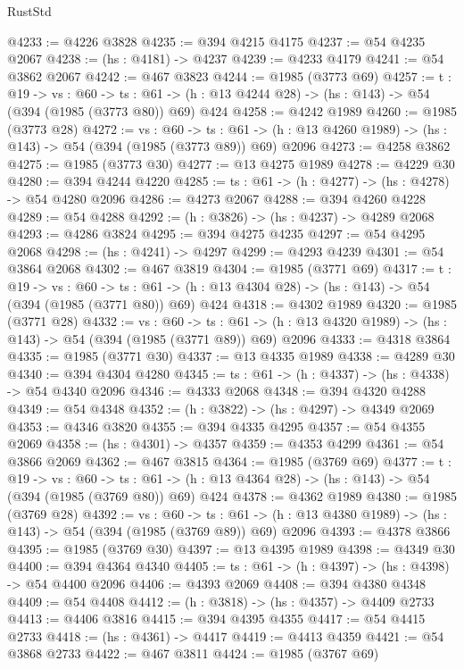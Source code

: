 \begin{lexlean}{RustStd}
\begin{coremodule}
@4233 := @4226 @3828
@4235 := @394 @4215 @4175
@4237 := @54 @4235 @2067
@4238 := (hs : @4181) -> @4237
@4239 := @4233 @4179
@4241 := @54 @3862 @2067
@4242 := @467 @3823
@4244 := @1985 (@3773 @69)
@4257 := {t : @19} ->
  {vs : @60} ->
  {ts : @61} -> (h : @13 @4244 @28) -> (hs : @143) -> @54 (@394 (@1985 (@3773 @80)) @69) @424
@4258 := @4242 @1989
@4260 := @1985 (@3773 @28)
@4272 := {vs : @60} ->
  {ts : @61} -> (h : @13 @4260 @1989) -> (hs : @143) -> @54 (@394 (@1985 (@3773 @89)) @69) @2096
@4273 := @4258 @3862
@4275 := @1985 (@3773 @30)
@4277 := @13 @4275 @1989
@4278 := @4229 @30
@4280 := @394 @4244 @4220
@4285 := {ts : @61} -> (h : @4277) -> (hs : @4278) -> @54 @4280 @2096
@4286 := @4273 @2067
@4288 := @394 @4260 @4228
@4289 := @54 @4288
@4292 := (h : @3826) -> (hs : @4237) -> @4289 @2068
@4293 := @4286 @3824
@4295 := @394 @4275 @4235
@4297 := @54 @4295 @2068
@4298 := (hs : @4241) -> @4297
@4299 := @4293 @4239
@4301 := @54 @3864 @2068
@4302 := @467 @3819
@4304 := @1985 (@3771 @69)
@4317 := {t : @19} ->
  {vs : @60} ->
  {ts : @61} -> (h : @13 @4304 @28) -> (hs : @143) -> @54 (@394 (@1985 (@3771 @80)) @69) @424
@4318 := @4302 @1989
@4320 := @1985 (@3771 @28)
@4332 := {vs : @60} ->
  {ts : @61} -> (h : @13 @4320 @1989) -> (hs : @143) -> @54 (@394 (@1985 (@3771 @89)) @69) @2096
@4333 := @4318 @3864
@4335 := @1985 (@3771 @30)
@4337 := @13 @4335 @1989
@4338 := @4289 @30
@4340 := @394 @4304 @4280
@4345 := {ts : @61} -> (h : @4337) -> (hs : @4338) -> @54 @4340 @2096
@4346 := @4333 @2068
@4348 := @394 @4320 @4288
@4349 := @54 @4348
@4352 := (h : @3822) -> (hs : @4297) -> @4349 @2069
@4353 := @4346 @3820
@4355 := @394 @4335 @4295
@4357 := @54 @4355 @2069
@4358 := (hs : @4301) -> @4357
@4359 := @4353 @4299
@4361 := @54 @3866 @2069
@4362 := @467 @3815
@4364 := @1985 (@3769 @69)
@4377 := {t : @19} ->
  {vs : @60} ->
  {ts : @61} -> (h : @13 @4364 @28) -> (hs : @143) -> @54 (@394 (@1985 (@3769 @80)) @69) @424
@4378 := @4362 @1989
@4380 := @1985 (@3769 @28)
@4392 := {vs : @60} ->
  {ts : @61} -> (h : @13 @4380 @1989) -> (hs : @143) -> @54 (@394 (@1985 (@3769 @89)) @69) @2096
@4393 := @4378 @3866
@4395 := @1985 (@3769 @30)
@4397 := @13 @4395 @1989
@4398 := @4349 @30
@4400 := @394 @4364 @4340
@4405 := {ts : @61} -> (h : @4397) -> (hs : @4398) -> @54 @4400 @2096
@4406 := @4393 @2069
@4408 := @394 @4380 @4348
@4409 := @54 @4408
@4412 := (h : @3818) -> (hs : @4357) -> @4409 @2733
@4413 := @4406 @3816
@4415 := @394 @4395 @4355
@4417 := @54 @4415 @2733
@4418 := (hs : @4361) -> @4417
@4419 := @4413 @4359
@4421 := @54 @3868 @2733
@4422 := @467 @3811
@4424 := @1985 (@3767 @69)

\end{coremodule}
\end{lexlean}
